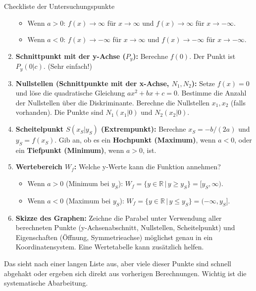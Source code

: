 \begin{merksatzumgebung}{Checkliste der Untersuchungspunkte}
\begin{enumerate}
        \begin{itemize}
            \item Wenn $a>0$: $f(x) \to \infty$ für $x \to \infty$ und $f(x) \to \infty$ für $x \to -\infty$.
            \item Wenn $a<0$: $f(x) \to -\infty$ für $x \to \infty$ und $f(x) \to -\infty$ für $x \to -\infty$.
        \end{itemize}
    \item \textbf{Schnittpunkt mit der y-Achse ($P_y$):}
        Berechne $f(0)$. Der Punkt ist $P_y(0|c)$. (Sehr einfach!)
    \item \textbf{Nullstellen (Schnittpunkte mit der x-Achse, $N_1, N_2$):}
        Setze $f(x)=0$ und löse die quadratische Gleichung $ax^2+bx+c=0$.
        Bestimme die Anzahl der Nullstellen über die Diskriminante.
        Berechne die Nullstellen $x_1, x_2$ (falls vorhanden). Die Punkte sind $N_1(x_1|0)$ und $N_2(x_2|0)$.
    \item \textbf{Scheitelpunkt $S(x_S|y_S)$ (Extrempunkt):}
        Berechne $x_S = -b/(2a)$ und $y_S = f(x_S)$.
        Gib an, ob es ein \textbf{Hochpunkt (Maximum)}, wenn $a<0$, oder ein \textbf{Tiefpunkt (Minimum)}, wenn $a>0$, ist.
    \item \textbf{Wertebereich $W_f$:} Welche y-Werte kann die Funktion annehmen?
        \begin{itemize}
            \item Wenn $a>0$ (Minimum bei $y_S$): $W_f = \{ y \in \mathbb{R} \,|\, y \ge y_S \} = [y_S, \infty)$.
            \item Wenn $a<0$ (Maximum bei $y_S$): $W_f = \{ y \in \mathbb{R} \,|\, y \le y_S \} = (-\infty, y_S]$.
        \end{itemize}
    \item \textbf{Skizze des Graphen:} Zeichne die Parabel unter Verwendung aller berechneten Punkte (y-Achsenabschnitt, Nullstellen, Scheitelpunkt) und Eigenschaften (Öffnung, Symmetrieachse) möglichst genau in ein Koordinatensystem. Eine Wertetabelle kann zusätzlich helfen.
\end{enumerate}
\end{merksatzumgebung}

Das sieht nach einer langen Liste aus, aber viele dieser Punkte sind schnell abgehakt oder ergeben sich direkt aus vorherigen Berechnungen. Wichtig ist die systematische Abarbeitung.

